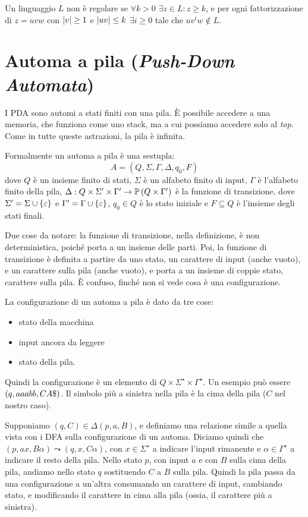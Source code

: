 \begin{theorem}
	Un linguaggio $L$ non \`e regolare se $\forall k > 0$ $\exists z \in L : z \ge k$, e per ogni fattorizzazione di $z = u v w$ con $\left\lvert{v}\right\rvert \ge 1$ e $\left\lvert{uv}\right\rvert \le k$ $\exists i \ge 0$ tale che $u v^i w \notin L$.
\end{theorem}

\section{Automa a pila (\emph{Push-Down Automata})}

I PDA sono automi a stati finiti con una pila.
\`E possibile accedere a una memoria, che funziona come uno stack, ma a cui possiamo accedere solo al \emph{top}.
Come in tutte queste astrazioni, la pila \`e infinita.

Formalmente un automa a pila \`e una sestupla:
\[
A = ( Q, \Sigma, \Gamma, \Delta, q_0, F )
\]
dove $Q$ \`e un insieme finito di stati, $\Sigma$ \`e un alfabeto finito di input, $\Gamma$ \`e l'alfabeto finito della pila, $\Delta : Q \times \Sigma' \times \Gamma' \to \mathbb{P} \left( { Q \times \Gamma' } \right)$ \`e la funzione di transizione, dove $\Sigma' = \Sigma \cup \{ \varepsilon \}$ e $\Gamma' = \Gamma \cup \{ \varepsilon \}$, $q_0 \in Q$ \`e lo stato iniziale e $F \subseteq Q$ \`e l'insieme degli stati finali.

Due cose da notare: la funzione di transizione, nella definizione, \`e non deterministica, poich\'e porta a un insieme delle parti.
Poi, la funzione di transizione \`e definita a partire da uno stato, un carattere di input (anche vuoto), e un carattere sulla pila (anche vuoto), e porta a un insieme di coppie stato, carattere sulla pila.
\`E confuso, finch\'e non si vede cosa \`e una configurazione.

La configurazione di un automa a pila \`e dato da tre cose:
\begin{itemize}
	\item stato della macchina
	\item input ancora da leggere
	\item stato della pila.
\end{itemize}
Quindi la configurazione \`e un elemento di $Q \times \Sigma^{\star} \times \Gamma^{\star}$. Un esempio pu\`o essere $(q, aaabb, CA\$)$.
Il simbolo pi\`u a sinistra nella pila \`e la cima della pila ($C$ nel nostro caso).

Supponiamo $(q, C) \in \Delta(p, a, B)$, e definiamo una relazione simile a quella vista con i DFA sulla configurazione di un automa.
Diciamo quindi che $(p, ax, B\alpha) \leadsto (q, x, C\alpha)$, con $x \in \Sigma^{\star}$ a indicare l'input rimanente e $\alpha \in \Gamma^{\star}$ a indicare il resto della pila.
Nello stato $p$, con input $a$ e con $B$ sulla cima della pila, andiamo nello stato $q$ sostituendo $C$ a $B$ sulla pila.
Quindi la pila passa da una configurazione a un'altra consumando un carattere di input, cambiando stato, e modificando il carattere in cima alla pila (ossia, il carattere pi\`u a sinistra).

